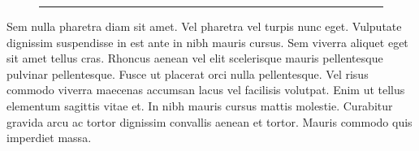 \documentclass{artikel3}
\begin{document}
\begin{wrapfigure}{r}{2in}
  \hrule width 3in height 0pt %
\end{wrapfigure}
Sem nulla pharetra diam sit amet. Vel pharetra vel turpis nunc eget. Vulputate dignissim suspendisse in est ante in nibh mauris cursus. Sem viverra aliquet eget sit amet tellus cras. Rhoncus aenean vel elit scelerisque mauris pellentesque pulvinar pellentesque. Fusce ut placerat orci nulla pellentesque. Vel risus commodo viverra maecenas accumsan lacus vel facilisis volutpat. Enim ut tellus elementum sagittis vitae et. In nibh mauris cursus mattis molestie. Curabitur gravida arcu ac tortor dignissim convallis aenean et tortor. Mauris commodo quis imperdiet massa.
\end{document}
